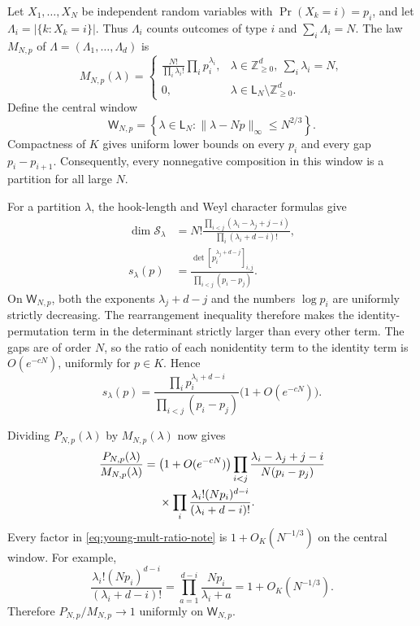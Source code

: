 \documentclass[11pt]{article}
\begin{document}
Let $X_1,\ldots,X_N$ be independent random variables with
$\Pr(X_k=i)=p_i$, and let
$\Lambda_i=|\{k:X_k=i\}|$.  Thus $\Lambda_i$ counts outcomes of type $i$ and
$\sum_i\Lambda_i=N$.  The law $M_{N,p}$ of
$\Lambda=(\Lambda_1,\ldots,\Lambda_d)$ is
\[
  M_{N,p}(\lambda)
  =\begin{cases}
    \displaystyle\frac{N!}{\prod_i\lambda_i!}
      \prod_i p_i^{\lambda_i},
      &\lambda\in\mathbb Z_{\geq0}^d,
       \ \sum_i\lambda_i=N,\\[2mm]
    0,&\lambda\in\mathsf L_N\setminus\mathbb Z_{\geq0}^d.
  \end{cases}
\]
Define the central window
\[
  \mathsf W_{N,p}
  =\left\{\lambda\in\mathsf L_N:
    \|\lambda-Np\|_\infty\leq N^{2/3}\right\}.
\]
Compactness of $K$ gives uniform lower bounds on every $p_i$ and every gap
$p_i-p_{i+1}$.  Consequently, every nonnegative composition in this window
is a partition for all large $N$.

For a partition $\lambda$, the hook-length and Weyl character formulas give
\begin{align*}
  \dim\mathcal S_\lambda
  &=N!\frac{\prod_{i<j}(\lambda_i-\lambda_j+j-i)}
    {\prod_i(\lambda_i+d-i)!},\\
  s_\lambda(p)
  &=\frac{\det[p_i^{\lambda_j+d-j}]_{i,j}}
    {\prod_{i<j}(p_i-p_j)}.
\end{align*}
On $\mathsf W_{N,p}$, both the exponents $\lambda_j+d-j$ and the numbers
$\log p_i$ are uniformly strictly decreasing.  The rearrangement inequality
therefore makes the identity-permutation term in the determinant strictly
larger than every other term.  The gaps are of order $N$, so the ratio of
each nonidentity term to the identity term is $O(e^{-cN})$, uniformly for
$p\in K$.  Hence
\[
  s_\lambda(p)
  =\frac{\prod_i p_i^{\lambda_i+d-i}}
    {\prod_{i<j}(p_i-p_j)}
    \bigl(1+O(e^{-cN})\bigr).
\]

Dividing $P_{N,p}(\lambda)$ by $M_{N,p}(\lambda)$ now gives
\begin{align}
  \frac{P_{N,p}(\lambda)}{M_{N,p}(\lambda)}
  ={}&\bigl(1+O(e^{-cN})\bigr)
  \prod_{i<j}
  \frac{\lambda_i-\lambda_j+j-i}{N(p_i-p_j)}\notag\\
  &\times
  \prod_i
  \frac{\lambda_i!(Np_i)^{d-i}}{(\lambda_i+d-i)!}.
  \label{eq:young-mult-ratio-note}
\end{align}
Every factor in \eqref{eq:young-mult-ratio-note} is
$1+O_K(N^{-1/3})$ on the central window.  For example,
\[
  \frac{\lambda_i!(Np_i)^{d-i}}{(\lambda_i+d-i)!}
  =\prod_{a=1}^{d-i}\frac{Np_i}{\lambda_i+a}
  =1+O_K(N^{-1/3}).
\]
Therefore $P_{N,p}/M_{N,p}\to1$ uniformly on $\mathsf W_{N,p}$.
\end{document}

